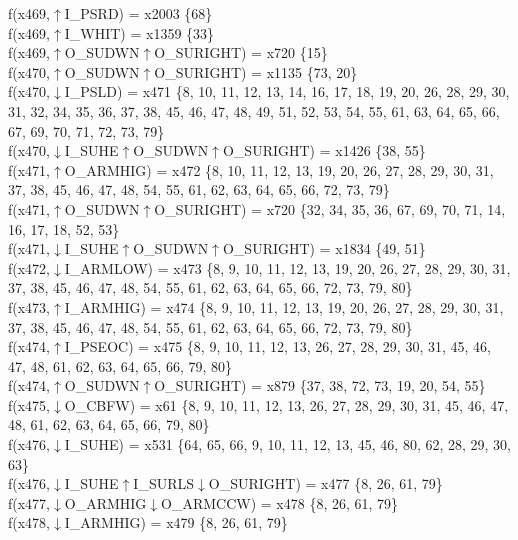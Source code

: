 f(x469,$\uparrow$I\_PSRD) = x2003 \{68\} \\  
f(x469,$\uparrow$I\_WHIT) = x1359 \{33\} \\  
f(x469,$\uparrow$O\_SUDWN$\uparrow$O\_SURIGHT) = x720 \{15\} \\  
f(x470,$\uparrow$O\_SUDWN$\uparrow$O\_SURIGHT) = x1135 \{73, 20\} \\  
f(x470,$\downarrow$I\_PSLD) = x471 \{8, 10, 11, 12, 13, 14, 16, 17, 18, 19, 20, 26, 28, 29, 30, 31, 32, 34, 35, 36, 37, 38, 45, 46, 47, 48, 49, 51, 52, 53, 54, 55, 61, 63, 64, 65, 66, 67, 69, 70, 71, 72, 73, 79\} \\  
f(x470,$\downarrow$I\_SUHE$\uparrow$O\_SUDWN$\uparrow$O\_SURIGHT) = x1426 \{38, 55\} \\  
f(x471,$\uparrow$O\_ARMHIG) = x472 \{8, 10, 11, 12, 13, 19, 20, 26, 27, 28, 29, 30, 31, 37, 38, 45, 46, 47, 48, 54, 55, 61, 62, 63, 64, 65, 66, 72, 73, 79\} \\  
f(x471,$\uparrow$O\_SUDWN$\uparrow$O\_SURIGHT) = x720 \{32, 34, 35, 36, 67, 69, 70, 71, 14, 16, 17, 18, 52, 53\} \\  
f(x471,$\downarrow$I\_SUHE$\uparrow$O\_SUDWN$\uparrow$O\_SURIGHT) = x1834 \{49, 51\} \\  
f(x472,$\downarrow$I\_ARMLOW) = x473 \{8, 9, 10, 11, 12, 13, 19, 20, 26, 27, 28, 29, 30, 31, 37, 38, 45, 46, 47, 48, 54, 55, 61, 62, 63, 64, 65, 66, 72, 73, 79, 80\} \\  
f(x473,$\uparrow$I\_ARMHIG) = x474 \{8, 9, 10, 11, 12, 13, 19, 20, 26, 27, 28, 29, 30, 31, 37, 38, 45, 46, 47, 48, 54, 55, 61, 62, 63, 64, 65, 66, 72, 73, 79, 80\} \\  
f(x474,$\uparrow$I\_PSEOC) = x475 \{8, 9, 10, 11, 12, 13, 26, 27, 28, 29, 30, 31, 45, 46, 47, 48, 61, 62, 63, 64, 65, 66, 79, 80\} \\  
f(x474,$\uparrow$O\_SUDWN$\uparrow$O\_SURIGHT) = x879 \{37, 38, 72, 73, 19, 20, 54, 55\} \\  
f(x475,$\downarrow$O\_CBFW) = x61 \{8, 9, 10, 11, 12, 13, 26, 27, 28, 29, 30, 31, 45, 46, 47, 48, 61, 62, 63, 64, 65, 66, 79, 80\} \\  
f(x476,$\downarrow$I\_SUHE) = x531 \{64, 65, 66, 9, 10, 11, 12, 13, 45, 46, 80, 62, 28, 29, 30, 63\} \\  
f(x476,$\downarrow$I\_SUHE$\uparrow$I\_SURLS$\downarrow$O\_SURIGHT) = x477 \{8, 26, 61, 79\} \\  
f(x477,$\downarrow$O\_ARMHIG$\downarrow$O\_ARMCCW) = x478 \{8, 26, 61, 79\} \\  
f(x478,$\downarrow$I\_ARMHIG) = x479 \{8, 26, 61, 79\} \\  
